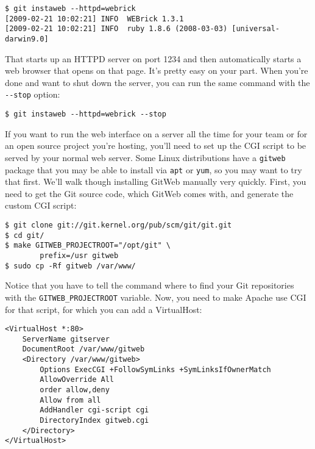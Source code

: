 \documentclass[a4paper]{book}
\begin{document}
\begin{shaded}\begin{verbatim}
$ git instaweb --httpd=webrick
[2009-02-21 10:02:21] INFO  WEBrick 1.3.1
[2009-02-21 10:02:21] INFO  ruby 1.8.6 (2008-03-03) [universal-darwin9.0]
\end{verbatim}\end{shaded}

That starts up an HTTPD server on port 1234 and then automatically starts a web browser that opens on that page. It's pretty easy on your part. When you're done and want to shut down the server, you can run the same command with the \texttt{-{}-stop} option:

\begin{shaded}\begin{verbatim}
$ git instaweb --httpd=webrick --stop
\end{verbatim}\end{shaded}

If you want to run the web interface on a server all the time for your team or for an open source project you're hosting, you'll need to set up the CGI script to be served by your normal web server. Some Linux distributions have a \texttt{gitweb} package that you may be able to install via \texttt{apt} or \texttt{yum}, so you may want to try that first. We'll walk though installing GitWeb manually very quickly. First, you need to get the Git source code, which GitWeb comes with, and generate the custom CGI script:

\begin{shaded}\begin{verbatim}
$ git clone git://git.kernel.org/pub/scm/git/git.git
$ cd git/
$ make GITWEB_PROJECTROOT="/opt/git" \
        prefix=/usr gitweb
$ sudo cp -Rf gitweb /var/www/
\end{verbatim}\end{shaded}

Notice that you have to tell the command where to find your Git repositories with the \texttt{GITWEB\_PROJECTROOT} variable. Now, you need to make Apache use CGI for that script, for which you can add a VirtualHost:

\begin{shaded}\begin{verbatim}
<VirtualHost *:80>
    ServerName gitserver
    DocumentRoot /var/www/gitweb
    <Directory /var/www/gitweb>
        Options ExecCGI +FollowSymLinks +SymLinksIfOwnerMatch
        AllowOverride All
        order allow,deny
        Allow from all
        AddHandler cgi-script cgi
        DirectoryIndex gitweb.cgi
    </Directory>
</VirtualHost>
\end{verbatim}\end{shaded}
\end{document}
